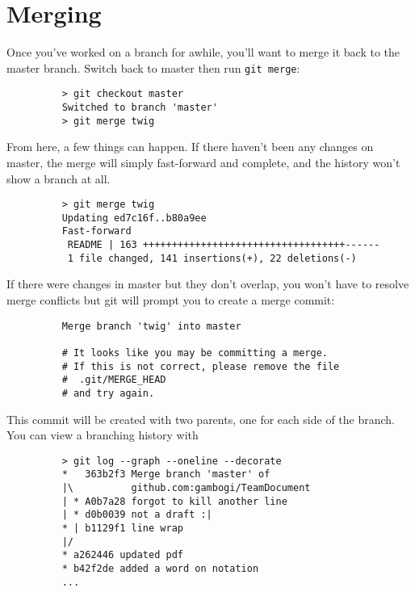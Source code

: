 \documentclass[11pt]{report}
\begin{document}
\section{Merging}

Once you've worked on a branch for awhile, you'll want to merge it
back to the master branch. Switch back to master then run
\texttt{git merge}:

\begin{figure}[H]
  \begin{lstlisting}
    > git checkout master
    Switched to branch 'master'
    > git merge twig
  \end{lstlisting}
\end{figure}

From here, a few things can happen. If there haven't been any changes
on master, the merge will simply fast-forward and complete, and the
history won't show a branch at all.

\begin{figure}[H]
  \begin{lstlisting}
    > git merge twig
    Updating ed7c16f..b80a9ee
    Fast-forward
     README | 163 +++++++++++++++++++++++++++++++++++------
     1 file changed, 141 insertions(+), 22 deletions(-)
  \end{lstlisting}
\end{figure}

If there were changes in master but they don't overlap, you won't have
to resolve merge conflicts but git will prompt you to create a merge
commit:

\begin{figure}[H]
  \begin{lstlisting}
    Merge branch 'twig' into master
    
    # It looks like you may be committing a merge.
    # If this is not correct, please remove the file
    #  .git/MERGE_HEAD
    # and try again.
  \end{lstlisting}
\end{figure}

This commit will be created with two parents, one for each side of the
branch. You can view a branching history with

\begin{figure}[H]
  \begin{lstlisting}
    > git log --graph --oneline --decorate
    *   363b2f3 Merge branch 'master' of
    |\          github.com:gambogi/TeamDocument
    | * A0b7a28 forgot to kill another line
    | * d0b0039 not a draft :|
    * | b1129f1 line wrap
    |/  
    * a262446 updated pdf
    * b42f2de added a word on notation
    ...
  \end{lstlisting}
\end{figure}
\end{document}
